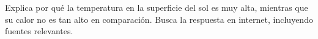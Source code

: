 \begin{exercise}
    Explica por qué la temperatura en la superficie del sol es muy alta, mientras que su calor no es tan alto en comparación.
    Busca la respuesta en internet, incluyendo fuentes relevantes.
\end{exercise}

%
%
%
%
%
%
%
%
%
%
%
%
